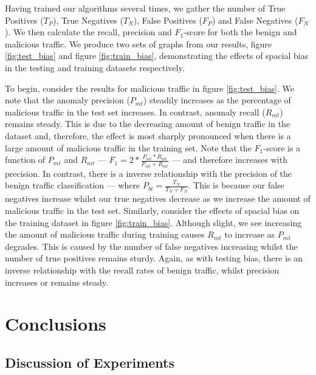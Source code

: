 \documentclass[msc,deptreport, cs]{infthesis} %
\begin{document}
\vspace{-3mm}

Having trained our algorithms several times, we gather the number of True Positives ($T_P$), True Negatives ($T_N$), False Positives ($F_P$) and False Negatives ($F_N$). We then calculate the recall, precision and $F_1$-score for both the benign and malicious traffic.  We produce two sets of graphs from our results, figure \ref{fig:test_bias} and figure \ref{fig:train_bias}, demonstrating the effects of spacial bias in the testing and training datasets respectively.

To begin, consider the results for malicious traffic in figure \ref{fig:test_bias}. We note that the anomaly precision ($P_{mt}$) steadily increases as the percentage of malicious traffic in the test set increases. In contrast, anomaly recall ($R_{mt}$)  remains steady. This is due to the decreasing amount of benign traffic in the dataset and, therefore, the effect is most sharply pronounced when there is a large amount of malicious traffic in the training set. Note that the $F_1$-score is a function of $P_{mt}$ and $R_{mt}$ --- $F_1 = 2*\frac{P_{mt} * R_{mt}}{P_{mt} + R_{mt}}$ --- and therefore increases with precision. In contrast, there is a inverse relationship with the precision of the benign traffic classification --- where $P_{bt} = \frac{T_N}{T_N + F_N}$. This is because our false negatives increase whilst our true negatives decrease as we increase the amount of malicious traffic in the test set. Similarly, consider the effects of spacial bias on the training dataset in figure \ref{fig:train_bias}. Although slight, we see increasing the amount of malicious traffic during training causes $R_{mt}$ to increase as $P_{mt}$ degrades. This is caused by the number of false negatives increasing whilst the number of true positives remains sturdy. Again, as  with testing bias, there is an inverse relationship with the recall rates of benign traffic, whilst precision increases or remains steady.




\chapter{Conclusions}
\label{sec:conc}

\section{Discussion of Experiments}
\end{document}
